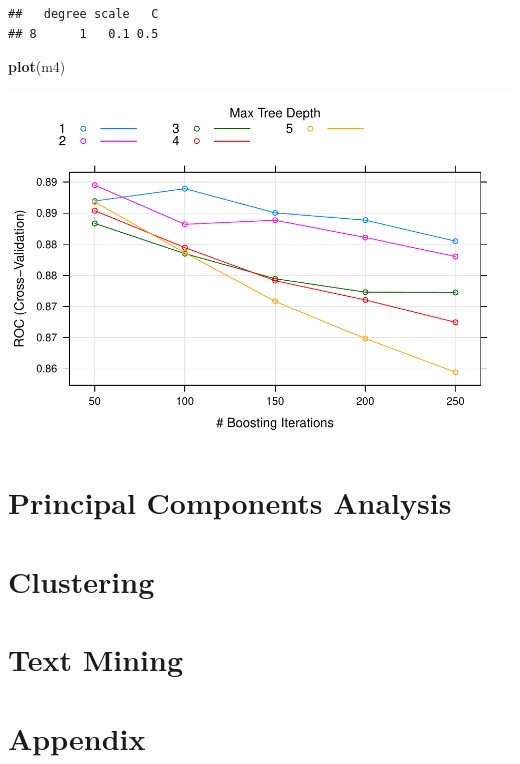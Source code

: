 \documentclass[]{book}
\newenvironment{Shaded}{\begin{snugshade}}{\end{snugshade}}
\newcommand{\KeywordTok}[1]{\textcolor[rgb]{0.13,0.29,0.53}{\textbf{#1}}}
\newcommand{\NormalTok}[1]{#1}
\begin{document}
\begin{verbatim}
##   degree scale   C
## 8      1   0.1 0.5
\end{verbatim}

\begin{Shaded}
\begin{Highlighting}[]
\KeywordTok{plot}\NormalTok{(m4)}
\end{Highlighting}
\end{Shaded}

\includegraphics{data-sci_files/figure-latex/unnamed-chunk-106-1.pdf}

\hypertarget{principal-components-analysis}{%
\chapter{Principal Components Analysis}\label{principal-components-analysis}}

\hypertarget{clustering}{%
\chapter{Clustering}\label{clustering}}

\hypertarget{text-mining}{%
\chapter{Text Mining}\label{text-mining}}

\hypertarget{appendix}{%
\chapter*{Appendix}\label{appendix}}
\end{document}
